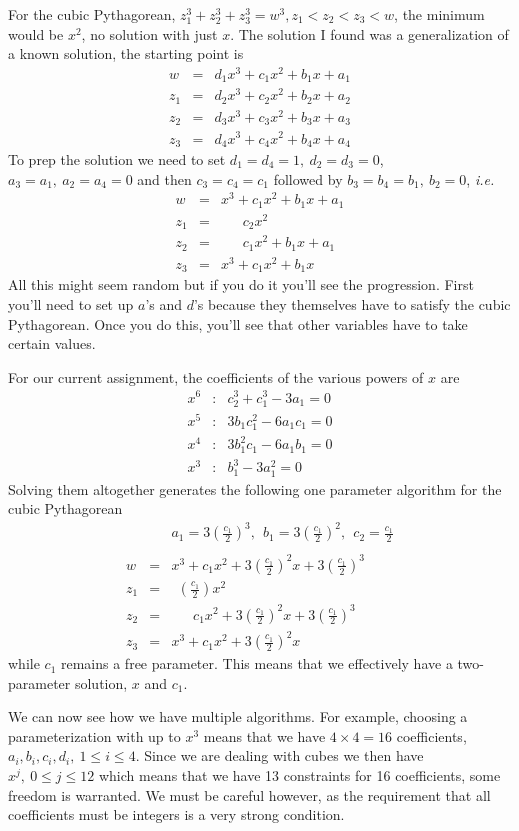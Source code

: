 \documentclass[aps,preprint,preprintnumbers,nofootinbib,showpacs,prd]{revtex4-1}
\newcommand{\ie}{{\it i.e.} }
\newcommand{\nbea}{\begin{eqnarray*}}
\newcommand{\neea}{\end{eqnarray*}}
\begin{document}
For the cubic Pythagorean, $z_1^3 + z_2^3 + z_3^3 = w^3, z_1 < z_2 < z_3 < w$, the minimum would be $x^2$, no solution with just $x$. The solution I found was a generalization of a known solution, the starting point is
%
\nbea
w & = & d_1 x^3 + c_1 x^2 + b_1 x + a_1\\
z_1 & = & d_2 x^3 + c_2 x^2 + b_2 x + a_2\\
z_2 & = & d_3 x^3 + c_3 x^2 + b_3 x + a_3\\
z_3 & = & d_4 x^3 + c_4 x^2 + b_4 x + a_4
\neea
%
To prep the solution we need to set $d_1 = d_4 = 1,~d_2 = d_3 = 0$, $a_3 = a_1,~a_2 = a_4 = 0$ and then $c_3 = c_4 = c_1$ followed by $b_3 = b_4 = b_1, ~ b_2=0$, \ie
%
\nbea
w & = & x^3 + c_1 x^2 + b_1 x + a_1\\
z_1 & = & ~~~~~~~c_2 x^2 \\
z_2 & = & ~~~~~~~c_1 x^2 + b_1 x + a_1\\
z_3 & = & x^3 + c_1 x^2 + b_1 x
\neea
%
All this might seem random but if you do it you'll see the progression. First you'll need to set up $a$'s and $d$'s because they themselves have to satisfy the cubic Pythagorean. Once you do this, you'll see that other variables have to take certain values.

For our current assignment, the coefficients of the various powers of $x$ are
%
\nbea
x^6 &:& c_2^3 + c_1^3 - 3 a_1 = 0\\
x^5 &:& 3 b_1 c_1^2 - 6 a_1 c_1 = 0\\
x^4 &:& 3 b_1^2 c_1 - 6 a_1 b_1 = 0\\
x^3 &:& b_1^3 - 3 a_1^2 = 0
\neea
%
Solving them altogether generates the following one parameter algorithm for the cubic Pythagorean
%
\nbea
&& a_1 = 3 \left ( \frac{c_1}{2} \right )^3, ~~b_1 = 3 \left ( \frac{c_1}{2} \right )^2, ~~c_2 = \frac{c_1}{2} \\ \\
w & = & x^3 + c_1 x^2 + 3 \left ( \frac{c_1}{2} \right )^2 x + 3 \left ( \frac{c_1}{2} \right )^3\\
z_1 & = & ~~\left ( \frac{c_1}{2} \right ) x^2 \\
z_2 & = & ~~~~~~~c_1 x^2 + 3 \left ( \frac{c_1}{2} \right )^2 x + 3 \left ( \frac{c_1}{2} \right )^3\\
z_3 & = & x^3 + c_1 x^2 + 3 \left ( \frac{c_1}{2} \right )^2 x
\neea
%
while $c_1$ remains a free parameter. This means that we effectively have a two-parameter solution, $x$ and $c_1$.

We can now see how we have multiple algorithms. For example, choosing a parameterization with up to $x^3$ means that we have $4 \times 4 = 16$ coefficients, $a_i, b_i, c_i, d_i,~1 \le i \le 4$. Since we are dealing with cubes we then have $x^j,~ 0 \le j \le 12$ which means that we have 13 constraints for 16 coefficients, some freedom is warranted. We must be careful however, as the requirement that all coefficients must be integers is a very strong condition.
\end{document}
